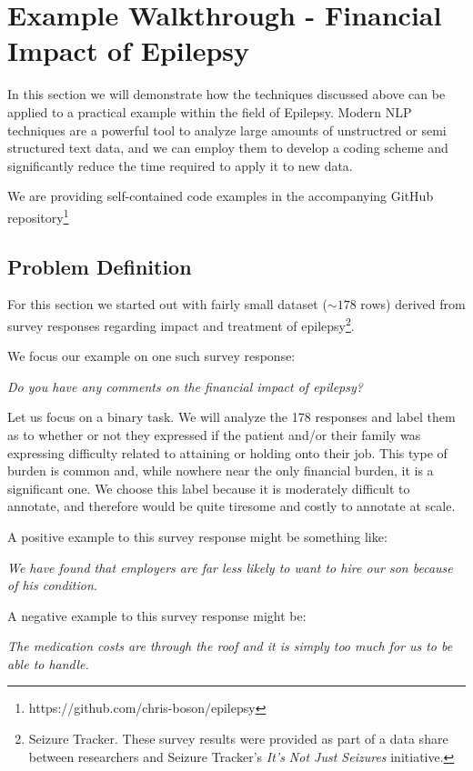 \section{Example Walkthrough - Financial Impact of Epilepsy}

In this section we will demonstrate how the techniques discussed above can be applied to a practical example within the field of Epilepsy.
Modern NLP techniques are a powerful tool to analyze large amounts of unstructred or semi structured text data, and we can employ them to develop a coding scheme and significantly reduce the time required to apply it to new data.

We are providing self-contained code examples in the accompanying GitHub repository\footnote{https://github.com/chris-boson/epilepsy}


\subsection{Problem Definition}
For this section we started out with fairly small dataset ($\sim178$ rows) derived from survey responses regarding impact and treatment of epilepsy\footnote{Seizure Tracker. These survey results were provided as part of a data share between researchers and Seizure Tracker's \textit{It's Not Just Seizures} initiative.}.

We focus our example on one such survey response:
\begin{displayquote}
    \textit{Do you have any comments on the financial impact of epilepsy?}
\end{displayquote}

Let us focus on a binary task. We will analyze the 178 responses and label them as to whether or not they expressed if the patient and/or their family was expressing difficulty related to attaining or holding onto their job. This
type of burden is common and, while nowhere near the only financial burden, it is a significant one. We choose this label because it is moderately difficult to annotate, and therefore would be quite tiresome and costly to annotate at scale.

A positive example to this survey response might be something like:
\begin{displayquote}
    \textit{We have found that employers are far less likely to want to hire our son because of his condition.}
\end{displayquote}

A negative example to this survey response might be:
\begin{displayquote}
    \textit{The medication costs are through the roof and it is simply too much for us to be able to handle.}
\end{displayquote}

